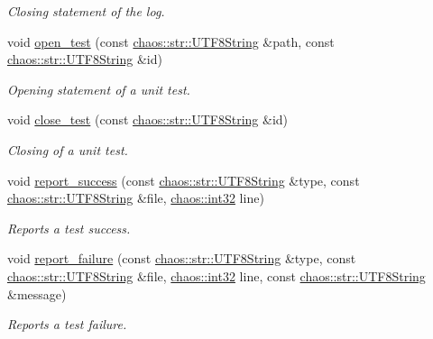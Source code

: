 \begin{DoxyCompactItemize}
\begin{DoxyCompactList}\small\item\em Closing statement of the log. \end{DoxyCompactList}\item 
void \hyperlink{classchaos_1_1test_1_1_test_logger_ac6744b59f304552bb819dd8f4d724143}{open\+\_\+test} (const \hyperlink{classchaos_1_1str_1_1_u_t_f8_string}{chaos\+::str\+::\+U\+T\+F8\+String} \&path, const \hyperlink{classchaos_1_1str_1_1_u_t_f8_string}{chaos\+::str\+::\+U\+T\+F8\+String} \&id)
\begin{DoxyCompactList}\small\item\em Opening statement of a unit test. \end{DoxyCompactList}\item 
void \hyperlink{classchaos_1_1test_1_1_test_logger_a5b1f6f1abbedaea7f5475e0dc2677c3c}{close\+\_\+test} (const \hyperlink{classchaos_1_1str_1_1_u_t_f8_string}{chaos\+::str\+::\+U\+T\+F8\+String} \&id)
\begin{DoxyCompactList}\small\item\em Closing of a unit test. \end{DoxyCompactList}\item 
void \hyperlink{classchaos_1_1test_1_1_test_logger_ae26a666c0a9aade6390edf9ec916c9d3}{report\+\_\+success} (const \hyperlink{classchaos_1_1str_1_1_u_t_f8_string}{chaos\+::str\+::\+U\+T\+F8\+String} \&type, const \hyperlink{classchaos_1_1str_1_1_u_t_f8_string}{chaos\+::str\+::\+U\+T\+F8\+String} \&file, \hyperlink{namespacechaos_ad1de7efb430365afd2c9446a0f522a90}{chaos\+::int32} line)
\begin{DoxyCompactList}\small\item\em Reports a test success. \end{DoxyCompactList}\item 
void \hyperlink{classchaos_1_1test_1_1_test_logger_a7bde1d40286619bbef932dfa72f9c419}{report\+\_\+failure} (const \hyperlink{classchaos_1_1str_1_1_u_t_f8_string}{chaos\+::str\+::\+U\+T\+F8\+String} \&type, const \hyperlink{classchaos_1_1str_1_1_u_t_f8_string}{chaos\+::str\+::\+U\+T\+F8\+String} \&file, \hyperlink{namespacechaos_ad1de7efb430365afd2c9446a0f522a90}{chaos\+::int32} line, const \hyperlink{classchaos_1_1str_1_1_u_t_f8_string}{chaos\+::str\+::\+U\+T\+F8\+String} \&message)
\begin{DoxyCompactList}\small\item\em Reports a test failure. \end{DoxyCompactList}\end{DoxyCompactItemize}


